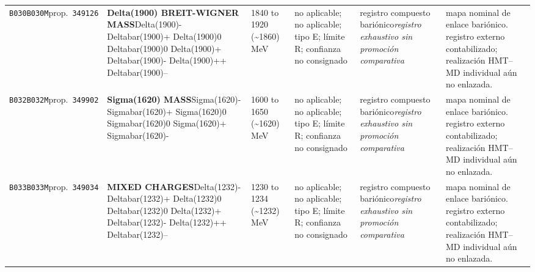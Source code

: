 \begin{landscape}
\begin{longtable}{L{1.85cm}L{4.45cm}L{2.35cm}L{4.05cm}L{3.35cm}L{7.15cm}}
\texttt{B030}\newline \texttt{B030M}\newline prop.\ \texttt{349126} & \textbf{Delta(1900) BREIT-WIGNER MASS}\newline Delta(1900)- \textbar{}\allowbreak{} Deltabar(1900)+ \textbar{}\allowbreak{} Delta(1900)0 \textbar{}\allowbreak{} Deltabar(1900)0 \textbar{}\allowbreak{} Delta(1900)+ \textbar{}\allowbreak{} Deltabar(1900)- \textbar{}\allowbreak{} Delta(1900)++ \textbar{}\allowbreak{} Deltabar(1900)-- & 1840 to 1920 (\textasciitilde{}1860)\,MeV & no aplicable; no aplicable; tipo E; límite R; confianza no consignado & registro compuesto bariónico\newline \emph{registro exhaustivo sin promoción comparativa} & mapa nominal de enlace bariónico. registro externo contabilizado; realización HMT--MD individual aún no enlazada. \\
\texttt{B032}\newline \texttt{B032M}\newline prop.\ \texttt{349902} & \textbf{Sigma(1620) MASS}\newline Sigma(1620)- \textbar{}\allowbreak{} Sigmabar(1620)+ \textbar{}\allowbreak{} Sigma(1620)0 \textbar{}\allowbreak{} Sigmabar(1620)0 \textbar{}\allowbreak{} Sigma(1620)+ \textbar{}\allowbreak{} Sigmabar(1620)- & 1600 to 1650 (\textasciitilde{}1620)\,MeV & no aplicable; no aplicable; tipo E; límite R; confianza no consignado & registro compuesto bariónico\newline \emph{registro exhaustivo sin promoción comparativa} & mapa nominal de enlace bariónico. registro externo contabilizado; realización HMT--MD individual aún no enlazada. \\
\texttt{B033}\newline \texttt{B033M}\newline prop.\ \texttt{349034} & \textbf{MIXED CHARGES}\newline Delta(1232)- \textbar{}\allowbreak{} Deltabar(1232)+ \textbar{}\allowbreak{} Delta(1232)0 \textbar{}\allowbreak{} Deltabar(1232)0 \textbar{}\allowbreak{} Delta(1232)+ \textbar{}\allowbreak{} Deltabar(1232)- \textbar{}\allowbreak{} Delta(1232)++ \textbar{}\allowbreak{} Deltabar(1232)-- & 1230 to 1234 (\textasciitilde{}1232)\,MeV & no aplicable; no aplicable; tipo E; límite R; confianza no consignado & registro compuesto bariónico\newline \emph{registro exhaustivo sin promoción comparativa} & mapa nominal de enlace bariónico. registro externo contabilizado; realización HMT--MD individual aún no enlazada. \\

\end{longtable}
\end{landscape}
